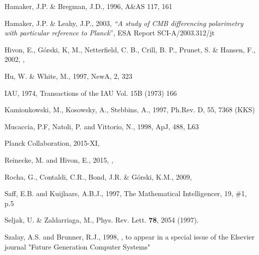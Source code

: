 \documentclass[12pt,twoside]{article}
\begin{document}
\begin{thebibliography}{99}
Hamaker, J.P. \& Bregman, J.D., 1996, A\&AS 117, 161

  Hamaker, J.P. \& Leahy, J.P., 2003, {\em ``A study of CMB differencing
  polarimetry with particular reference to {\em Planck}}'', {\sc ESA Report SCI-A/2003.312/jt}

Hivon, E., G{\'o}rski, K, M., Netterfield, C. B., Crill, B. P., Prunet, S. \& Hansen, F., 
2002, , 

Hu, W. \& White, M., 1997, NewA, 2, 323

IAU, 1974, Transactions of the IAU Vol. 15B (1973) 166

Kamionkowski, M., Kosowsky, A., Stebbins, A., 1997, Ph.Rev. D, 55, 7368 (KKS)

Mucaccia, P.F, Natoli, P. and Vittorio, N., 1998, ApJ, 488, L63

Planck Collaboration, 2015-XI, 

Reinecke, M. and Hivon, E., 2015, 
, 

Rocha, G., Contaldi, C.R., Bond, J.R. \& G\'orski, K.M., 2009,

Saff, E.B. and Kuijlaars, A.B.J., 1997, The Mathematical 
Intelligencer, 19, \#1, p.5

Seljak, U. \& Zaldarriaga, M., Phys. Rev. Lett. \textbf{78}, 2054 (1997).   

Szalay, A.S. and Brunner, R.J., 1998, 
, to appear in 
a special issue of the Elsevier journal "Future Generation Computer Systems"


\end{thebibliography}
\end{document}
